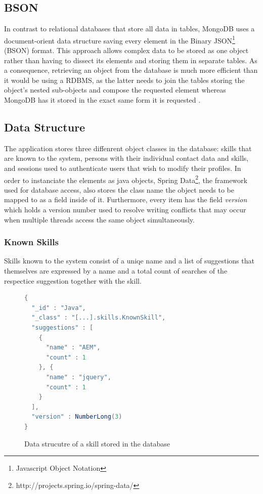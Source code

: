 \subsection{BSON}
\label{BSON}
In contrast to relational databases that store all data in tables, MongoDB uses a document-orient data structure saving every element in the Binary JSON\footnote{Javascript Object Notation} (BSON) format. This approach allows complex data to be stored as one object rather than having to dissect its elements and storing them in separate tables. As a consequence, retrieving an object from the database is much more efficient than it would be using a RDBMS, as the latter needs to join the tables storing the object's nested sub-objects and compose the requested element whereas MongoDB has it stored in the exact same form it is requested \cite[p. 10]{MongoGuide}.

\subsection{Data Structure}
The application stores three diffenrent object classes in the database: skills that are known to the system, persons with their individual contact data and skills, and sessions used to authenticate users that wish to modify their profiles. In order to instanciate the elements as java objects, Spring Data\footnote{http://projects.spring.io/spring-data/}, the framework used for database access, also stores the class name the object needs to be mapped to as a field inside of it. Furthermore, every item has the field \textit{version} which holds a version number used to resolve writing conflicts that may occur when multiple threads access the same object simultaneously.

\newpage
\subsubsection{Known Skills}
Skills known to the system consist of a uniqe name and a list of suggestions that themselves are expressed by a name and a total count of searches of the respectice suggestion together with the skill.
\begin{figure}[h]
\begin{lstlisting}[language=Java]
{
  "_id" : "Java",
  "_class" : "[...].skills.KnownSkill",
  "suggestions" : [
    {
      "name" : "AEM",
      "count" : 1
    }, {
      "name" : "jquery",
      "count" : 1
    }
  ],
  "version" : NumberLong(3)
}
\end{lstlisting}
\caption[Skill (DB Data Structure)]{Data strucutre of a skill stored in the database}
\end{figure}

